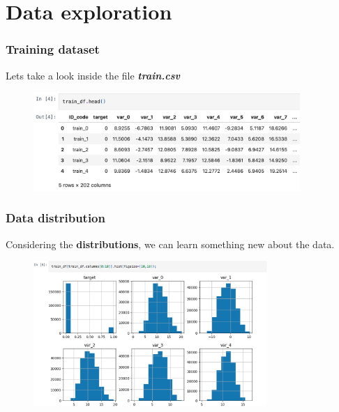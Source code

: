 \documentclass{beamer}
\begin{document}

\section{Data exploration}

\begin{frame}
\frametitle{Training dataset}
Lets take a look inside the file \textit{\textbf{train.csv}}
\begin{figure}
\centering
    \includegraphics[width=0.9\textwidth]{imgs/training.png}
    \label{fig:training}
\end{figure}
\end{frame}

\begin{frame}
\frametitle{Data distribution}
Considering the \textbf{distributions}, we can learn something new about the data.
\begin{figure}
\centering
    \includegraphics[width=0.79\textwidth]{imgs/distribution.png}
    \label{fig:distribution}
\end{figure}
\end{frame}
\end{document}
